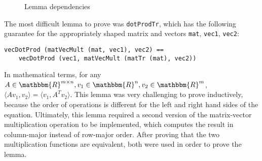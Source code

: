 \documentclass[12pt]{article}
\begin{document}
\begin{figure}[h]
\caption{Lemma dependencies}
\label{fig:dep-graph}
\centering
\end{figure}

The most difficult lemma to prove was \verb|dotProdTr|, which has the following guarantee for the appropriately shaped matrix and vectors \verb|mat|, \verb|vec1|, \verb|vec2|:

\begin{verbatim}
vecDotProd (matVecMult (mat, vec1), vec2) == 
    vecDotProd (vec1, matVecMult (matTr (mat), vec2))
\end{verbatim}

In mathematical terms, for any $A \in \mathbbm{R}^{m \times n}, v_1 \in \mathbbm{R}^n, v_2 \in \mathbbm{R}^m$, $\langle Av_1, v_2 \rangle = \langle v_1, A^T v_2 \rangle$. This lemma was very challenging to prove inductively, because the order of operations is different for the left and right hand sides of the equation. Ultimately, this lemma required a second version of the matrix-vector multiplication operation to be implemented, which computes the result in column-major instead of row-major order. After proving that the two multiplication functions are equivalent, both were used in order to prove the lemma.
\end{document}
